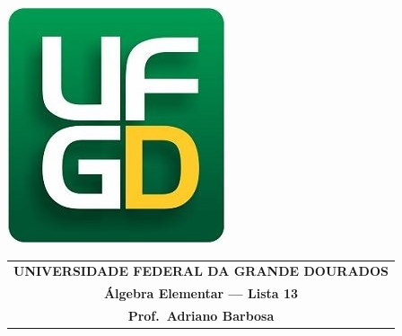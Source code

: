\documentclass[a4paper,5pt]{amsbook}
\begin{document}
\thispagestyle{empty}
\pagestyle{empty}
\begin{minipage}[h]{0.14\textwidth}
	\includegraphics[scale=0.24]{../ufgd.png}
\end{minipage}
\begin{minipage}[h]{\textwidth}
\begin{tabular}{c}
{{\bf UNIVERSIDADE FEDERAL DA GRANDE DOURADOS}}\\
{{\bf \'Algebra Elementar --- Lista 13}}\\
{{\bf Prof.\ Adriano Barbosa}}\\
\end{tabular}
\vspace{-0.45cm}
%
\end{minipage}

\end{document}
